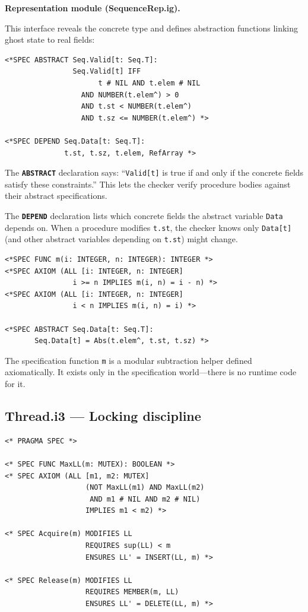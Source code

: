\documentclass[11pt]{article}
\newcommand{\m}[1]{\texttt{#1}}
\newcommand{\kw}[1]{\texttt{\textbf{#1}}}
\begin{document}
\medskip\noindent\textbf{Representation module (SequenceRep.ig).}

\noindent This interface reveals the concrete type and defines abstraction
functions linking ghost state to real fields:

\begin{lstlisting}[language=ESC]
<*SPEC ABSTRACT Seq.Valid[t: Seq.T]:
                Seq.Valid[t] IFF
                      t # NIL AND t.elem # NIL
                  AND NUMBER(t.elem^) > 0
                  AND t.st < NUMBER(t.elem^)
                  AND t.sz <= NUMBER(t.elem^) *>

<*SPEC DEPEND Seq.Data[t: Seq.T]:
              t.st, t.sz, t.elem, RefArray *>
\end{lstlisting}

The \kw{ABSTRACT} declaration says: ``\m{Valid[t]} is true if and only
if the concrete fields satisfy these constraints.''  This lets the
checker verify procedure bodies against their abstract specifications.

The \kw{DEPEND} declaration lists which concrete fields the abstract
variable \m{Data} depends on.  When a procedure modifies \m{t.st},
the checker knows only \m{Data[t]} (and other abstract variables
depending on \m{t.st}) might change.

\begin{lstlisting}[language=ESC]
<*SPEC FUNC m(i: INTEGER, n: INTEGER): INTEGER *>
<*SPEC AXIOM (ALL [i: INTEGER, n: INTEGER]
                i >= n IMPLIES m(i, n) = i - n) *>
<*SPEC AXIOM (ALL [i: INTEGER, n: INTEGER]
                i < n IMPLIES m(i, n) = i) *>

<*SPEC ABSTRACT Seq.Data[t: Seq.T]:
       Seq.Data[t] = Abs(t.elem^, t.st, t.sz) *>
\end{lstlisting}

The specification function \m{m} is a modular subtraction
helper defined axiomatically.  It exists only in the specification
world---there is no runtime code for it.

\subsection{Thread.i3 --- Locking discipline}
\label{sec:thread}

\begin{lstlisting}[language=ESC]
<* PRAGMA SPEC *>

<* SPEC FUNC MaxLL(m: MUTEX): BOOLEAN *>
<* SPEC AXIOM (ALL [m1, m2: MUTEX]
                   (NOT MaxLL(m1) AND MaxLL(m2)
                    AND m1 # NIL AND m2 # NIL)
                   IMPLIES m1 < m2) *>

<* SPEC Acquire(m) MODIFIES LL
                   REQUIRES sup(LL) < m
                   ENSURES LL' = INSERT(LL, m) *>

<* SPEC Release(m) MODIFIES LL
                   REQUIRES MEMBER(m, LL)
                   ENSURES LL' = DELETE(LL, m) *>
\end{lstlisting}
\end{document}
